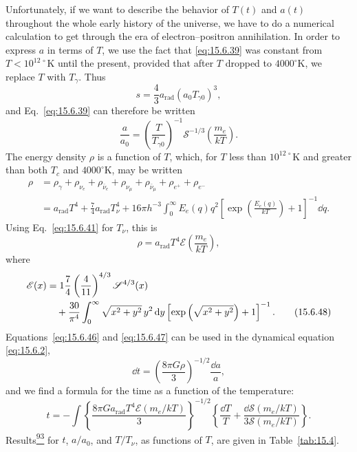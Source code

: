 Unfortunately, if we want to describe the behavior of \(T(t)\) and \(a(t)\)
throughout the whole early history of the universe, we have to do a numerical
calculation to get through the era of electron--positron annihilation. In order
to express \(a\) in terms of \(T\), we use the fact that \eqref{eq:15.6.39}
was constant from \(T<10^{12\,\circ}\mathrm K\) until the present, provided
that after \(T\) dropped to \(4000^\circ\mathrm K\), we replace \(T\) with
\(T_\gamma\). Thus
\begin{equation}
  s
  =
  \frac43a_{\mathrm{rad}}(a_0T_{\gamma0})^3,
  \tag{15.6.45}\label{eq:15.6.45}
\end{equation}
and Eq.~\eqref{eq:15.6.39} can therefore be written
\begin{equation}
  \frac{a}{a_0}
  =
  \left(\frac{T}{T_{\gamma0}}\right)^{-1}
  \mathscr S^{-1/3}\left(\frac{m_e}{kT}\right).
  \tag{15.6.46}\label{eq:15.6.46}
\end{equation}
The energy density \(\rho\) is a function of \(T\), which, for \(T\) less
than \(10^{12\,\circ}\mathrm K\) and greater than both \(T_c\) and
\(4000^\circ\mathrm K\), may be written
\begin{align*}
  \rho
  &=
  \rho_\gamma+\rho_{\nu_e}+\rho_{\bar\nu_e}
  +\rho_{\nu_\mu}+\rho_{\bar\nu_\mu}
  +\rho_{e^+}+\rho_{e^-}
  \\
  &=
  a_{\mathrm{rad}}T^4
  +\frac74a_{\mathrm{rad}}T_\nu^4
  +16\pi h^{-3}\int_0^\infty
  E_e(q)q^2
  \left[
    \exp\left(\frac{E_e(q)}{kT}\right)+1
  \right]^{-1}\dd q.
\end{align*}
Using Eq.~\eqref{eq:15.6.41} for \(T_\nu\), this is
\begin{equation}
  \rho
  =
  a_{\mathrm{rad}}T^4
  \mathscr E\left(\frac{m_e}{kT}\right),
  \tag{15.6.47}\label{eq:15.6.47}
\end{equation}
where
\begin{align}
  \mathscr E(x)
  &=
  1
  \frac74\left(\frac4{11}\right)^{4/3}
  \mathscr S^{4/3}(x)
  \notag\\
  &\quad
  +
  \frac{30}{\pi^4}\int_0^\infty
  \sqrt{x^2+y^2}\,y^2\mathop{}\!\mathrm{d} y
  \left[
    \exp\left(\sqrt{x^2+y^2}\right)+1
  \right]^{-1}.
  \tag{15.6.48}\label{eq:15.6.48}
\end{align}
Equations~\eqref{eq:15.6.46} and \eqref{eq:15.6.47} can be used in the
dynamical equation \eqref{eq:15.6.2},
\[
  \dd t
  =
  \left(\frac{8\pi G\rho}{3}\right)^{-1/2}
  \frac{\dd a}{a},
\]
and we find a formula for the time as a function of the temperature:
\begin{equation}
  t
  =
  -\int
  \left\{
    \frac{8\pi G a_{\mathrm{rad}}T^4
    \mathscr E(m_e/kT)}{3}
  \right\}^{-1/2}
  \left\{
    \frac{\dd T}{T}
    +
    \frac{\dd\mathscr S(m_e/kT)}
         {3\mathscr S(m_e/kT)}
  \right\}.
  \tag{15.6.49}\label{eq:15.6.49}
\end{equation}
Results\hyperref[ch15-ref-93]{\textsuperscript{93}} for \(t\), \(a/a_0\),
and \(T/T_\nu\), as functions of \(T\), are given in Table~\ref{tab:15.4}.

